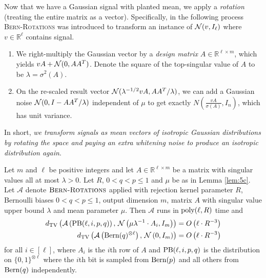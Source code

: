 \documentclass[final,12pt]{colt2023} %
\newcommand\1[1]{\mathbb{I}_{\left\{#1\right\}}}
\begin{document}
Now that we have a Gaussian signal with planted mean, we apply a \emph{rotation} (treating the entire matrix as a vector). Specifically, in \cite{BB20} the following process \textsc{Bern-Rotations} was introduced to transform an instance of $\mathcal{N}(v, I_\ell)$ where $v\in\mathbb{R}^{\ell}$ contains signal.\begin{enumerate}
    \item We right-multiply the Gaussian vector by a \emph{design matrix} $A\in\mathbb{R}^{\ell\times m}$, which yields $vA+\mathcal{N}(0, AA^T)$. Denote the square of the top-singular value of $A$ to be $\lambda=\sigma^2(A)$.
    \item On the re-scaled result vector $\mathcal{N}({\lambda^{-1/2}}vA, AA^T/\lambda)$, we can add a Gaussian noise $\mathcal{N}(0, I-AA^T/\lambda)$ independent of $\mu$ to get exactly $N(\frac{vA}{\sigma(A)}, I_n)$, which has unit variance.
\end{enumerate}
 In short, \emph{we transform signals as mean vectors of isotropic Gaussian distributions by rotating the space and paying an extra whitening noise to produce an isotropic distribution again}.

 
\begin{lemma} \label{lem:bern-rotations}
Let $m$ and $\ell$ be positive integers and let $A \in \mathbb{R}^{\ell \times m}$ be a matrix with singular values all at most $\lambda > 0$. Let $R$, $0 < q < p \le 1$ and $\mu$ be as in Lemma \ref{lem:5c}. Let $\mathcal{A}$ denote $\textsc{Bern-Rotations}$ applied with rejection kernel parameter $R$, Bernoulli biases $0 < q < p \le 1$, output dimension $m$, matrix $A$ with singular value upper bound $\lambda$ and mean parameter $\mu$. Then $\mathcal{A}$ runs in $\textnormal{poly}(\ell, R)$ time and
\begin{align*}
d_{\rm TV}\left( \mathcal{A}\left( \textup{PB}(\ell, i, p, q) \right), \, \mathcal{N}\left( \mu \lambda^{-1} \cdot A_{i}, I_m\right) \right) &= O\left(\ell\cdot R^{-3}\right) \\
d_{\rm TV}\left( \mathcal{A}\left( \textnormal{Bern}(q)^{\otimes \ell} \right), \, \mathcal{N}\left( 0, I_m\right) \right) &= O\left(\ell\cdot R^{-3}\right)
\end{align*}
for all $i \in [\ell]$, where $A_i$ is the $i$th row of $A$ and $\textup{PB}(\ell, i, p, q)$ is the distribution on $\{0, 1\}^{\otimes \ell}$ where the $i$th bit is sampled from ${\rm Bern}(p)$ and all others from ${\rm Bern}(q)$ independently.
\end{lemma}
\end{document}
